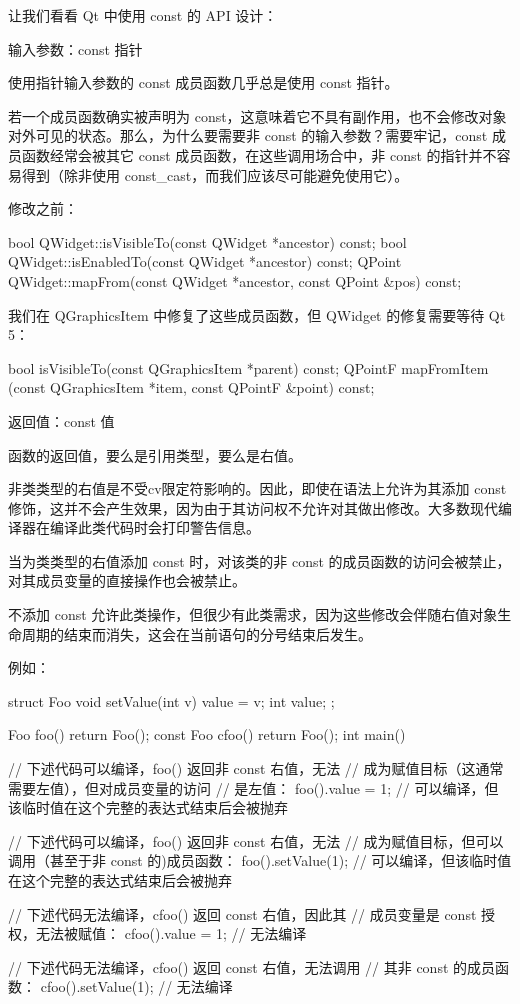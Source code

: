 让我们看看 Qt 中使用 const 的 API 设计：

输入参数：const 指针

使用指针输入参数的 const 成员函数几乎总是使用 const 指针。

若一个成员函数确实被声明为 const，这意味着它不具有副作用，也不会修改对象对外可见的状态。那么，为什么要需要非 const 的输入参数？需要牢记，const 成员函数经常会被其它 const 成员函数，在这些调用场合中，非 const 的指针并不容易得到（除非使用 const\_cast，而我们应该尽可能避免使用它）。

修改之前：

\begin{cppcode}
bool QWidget::isVisibleTo(const QWidget *ancestor) const;
bool QWidget::isEnabledTo(const QWidget *ancestor) const;
QPoint QWidget::mapFrom(const QWidget *ancestor, const QPoint &pos) const;
\end{cppcode}

\begin{notice}
我们在 QGraphicsItem 中修复了这些成员函数，但 QWidget 的修复需要等待 Qt 5：
\end{notice}


\begin{cppcode}
bool isVisibleTo(const QGraphicsItem *parent) const;
QPointF mapFromItem (const QGraphicsItem *item, const QPointF &point) const; 
\end{cppcode}

返回值：const 值

函数的返回值，要么是引用类型，要么是右值。

非类类型的右值是不受cv限定符影响的。因此，即使在语法上允许为其添加 const 修饰，这并不会产生效果，因为由于其访问权不允许对其做出修改。大多数现代编译器在编译此类代码时会打印警告信息。

当为类类型的右值添加 const 时，对该类的非 const 的成员函数的访问会被禁止，对其成员变量的直接操作也会被禁止。

不添加 const 允许此类操作，但很少有此类需求，因为这些修改会伴随右值对象生命周期的结束而消失，这会在当前语句的分号结束后发生。

例如：

\begin{cppcode}
struct Foo {
	void setValue(int v) { value = v; } int value;
};

Foo foo() { return Foo(); }
const Foo cfoo() { return Foo(); }
int main() {
	// 下述代码可以编译，foo() 返回非 const 右值，无法
	// 成为赋值目标（这通常需要左值），但对成员变量的访问
	// 是左值：
	foo().value = 1; // 可以编译，但该临时值在这个完整的表达式结束后会被抛弃
	
	// 下述代码可以编译，foo() 返回非 const 右值，无法
	// 成为赋值目标，但可以调用（甚至于非 const 的)成员函数：
	foo().setValue(1); // 可以编译，但该临时值在这个完整的表达式结束后会被抛弃
	
	// 下述代码无法编译，cfoo() 返回 const 右值，因此其
	// 成员变量是 const 授权，无法被赋值：
	cfoo().value = 1; // 无法编译
	
	// 下述代码无法编译，cfoo() 返回 const 右值，无法调用
	// 其非 const 的成员函数：
	cfoo().setValue(1); // 无法编译
}
\end{cppcode}


